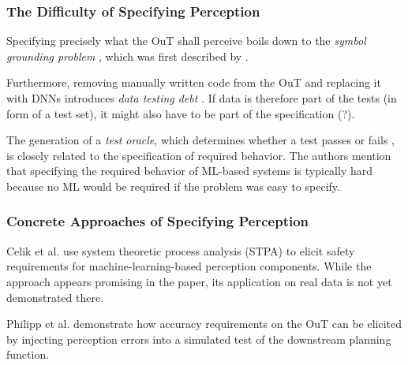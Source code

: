 \documentclass[conference]{IEEEtran}
\newcommand{\citeold}[1]{{\hypersetup{citecolor=black}\cite{#1}}}
\begin{document}
\subsubsection{The Difficulty of Specifying Perception}

Specifying precisely what the OuT shall perceive boils down to the \textit{symbol grounding problem} \citeold{Salay2019partialspecifications}, which was first described by \cite{Harnad1990symbolgrounding}.

Furthermore, removing manually written code from the OuT and replacing it with DNNs introduces \textit{data testing debt} \cite{Sculley2015debt}. 
If data is therefore part of the tests (in form of a test set), it might also have to be part of the specification (?).

The generation of a \textit{test oracle}, which determines whether a test passes or fails \cite{Abrecht2021testing}, is closely related to the specification of required behavior. 
The authors mention that specifying the required behavior of ML-based systems is typically hard because no ML would be required if the problem was easy to specify.


\subsubsection{Concrete Approaches of Specifying Perception} 

Celik et al. \cite{Celik2022stpa} use system theoretic process analysis (STPA) to elicit safety requirements for machine-learning-based perception components. While the approach appears promising in the paper, its application on real data is not yet demonstrated there. 

Philipp et al. \cite{Philipp2021requirements} demonstrate how accuracy requirements on the OuT can be elicited by injecting perception errors into a simulated test of the downstream planning function. 
\end{document}
